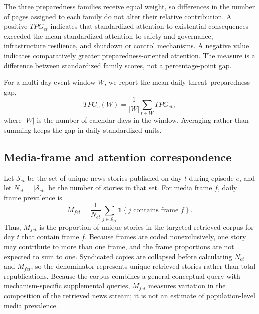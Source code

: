 \elsevierclasstrue\documentclass[preprint,12pt]{elsarticle}%
\begin{document}
The three preparedness families receive equal weight, so differences in the number of pages assigned to each family do not alter their relative contribution. A positive $TPG_{et}$ indicates that standardized attention to existential consequences exceeded the mean standardized attention to safety and governance, infrastructure resilience, and shutdown or control mechanisms. A negative value indicates comparatively greater preparedness-oriented attention. The measure is a difference between standardized family scores, not a percentage-point gap.

For a multi-day event window \(W\), we report the mean daily threat--preparedness gap,
\begin{equation}
TPG_e(W)
=
\frac{1}{\lvert W\rvert}
\sum_{t\in W} TPG_{et},
\label{eq:windowtpg}
\end{equation}
where \(\lvert W\rvert\) is the number of calendar days in the window. Averaging rather than summing keeps the gap in daily standardized units.


\subsection{Media-frame and attention correspondence}

Let $\mathcal{S}_{et}$ be the set of unique news stories published on day $t$ during episode $e$, and let $N_{et}=\lvert\mathcal{S}_{et}\rvert$ be the number of stories in that set. For media frame $f$, daily frame prevalence is
\begin{equation}
M_{fet}
  =\frac{1}{N_{et}}
   \sum_{j\in\mathcal{S}_{et}}
   \mathbf{1}\!\left\{j\text{ contains frame }f\right\}.
\label{eq:frameprevalence}
\end{equation}
Thus, $M_{fet}$ is the proportion of unique stories in the targeted retrieved corpus for day $t$ that contain frame $f$. Because frames are coded nonexclusively, one story may contribute to more than one frame, and the frame proportions are not expected to sum to one. Syndicated copies are collapsed before calculating $N_{et}$ and $M_{fet}$, so the denominator represents unique retrieved stories rather than total republications. Because the corpus combines a general conceptual query with mechanism-specific supplemental queries, \(M_{fet}\) measures variation in the composition of the retrieved news stream; it is not an estimate of population-level media prevalence.
\end{document}
